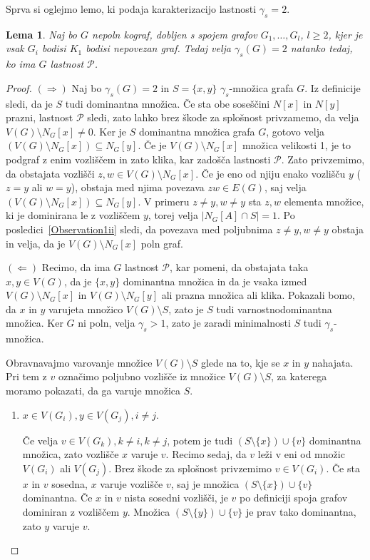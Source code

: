 \documentclass[12pt,a4paper,twoside]{article}
\theoremstyle{definition} %
\theoremstyle{plain} %
\newtheorem{lema}[definicija]{Lema}
\numberwithin{equation}{section}  %
\begin{document}
 Sprva si oglejmo lemo, ki  podaja karakterizacijo lastnosti $\gamma_s = 2$.
\begin{lema}\label{Lema4} Naj bo $G$ nepoln kograf, dobljen s spojem grafov $G_1, \dots, G_l$, $l \geq 2$, kjer je vsak $G_i$ bodisi $K_1$ bodisi nepovezan graf. Tedaj velja $\gamma_s(G) = 2$ natanko tedaj, ko ima $G$ lastnost $\mathcal{P}$.
\end{lema}
\begin{proof}
$(\Rightarrow)$ Naj bo $\gamma_s(G) = 2$ in $S = \{x,y\}$ $\gamma_s$-množica grafa $G$. Iz definicije sledi, da je $S$ tudi dominantna množica. Če sta obe soseščini $N[x]$ in $N[y]$ prazni, lastnost $\mathcal{P}$ sledi, zato lahko brez škode za splošnost privzamemo, da velja $V(G) \setminus N_G[x] \neq 0$. Ker je $S$ dominantna množica grafa $G$, gotovo velja $(V(G) \setminus N_G[x]) \subseteq N_G[y]$. Če je $V(G) \setminus N_G[x]$ množica velikosti 1, je to podgraf z enim vozliščem in zato klika, kar zadošča lastnosti $\mathcal{P}$. Zato privzemimo, da obstajata vozlišči $z,w \in V(G) \setminus N_G[x]$. Če je eno od njiju enako vozlišču $y$ ($z=y$ ali $w=y$), obstaja med njima povezava $zw \in E(G)$, saj velja $(V(G) \setminus N_G[x]) \subseteq N_G[y]$. V primeru $z \neq y, w \neq y$ sta $z,w$ elementa množice, ki je dominirana le z vozliščem $y$, torej velja $|N_G[A] \cap S| = 1$. Po posledici~\ref{Observation1ii} sledi, da povezava med poljubnima $z \neq y, w \neq y$ obstaja in velja, da je $V(G) \setminus N_G[x]$ poln graf.

$(\Leftarrow)$ Recimo, da ima $G$ lastnost $\mathcal{P}$, kar pomeni, da obstajata taka $x,y \in V(G)$, da je $\{x,y\}$ dominantna množica in da je vsaka izmed $V(G) \setminus N_G[x]$ in $V(G) \setminus N_G[y]$ ali prazna množica ali klika. Pokazali bomo, da $x$ in $y$ varujeta množico $V(G) \setminus S$, zato je $S$ tudi varnostnodominantna množica. Ker $G$ ni poln, velja $\gamma_s > 1$, zato je zaradi minimalnosti $S$ tudi $\gamma_s$-množica.

Obravnavajmo varovanje množice $V(G) \setminus S$ glede na to, kje se $x$ in $y$ nahajata. Pri tem z $v$ označimo poljubno vozlišče iz množice $V(G) \setminus S$, za katerega moramo pokazati, da ga varuje množica $S$.
\begin{enumerate}[label=($\roman*$)]
\item $x \in V(G_i), y \in V(G_j), i \neq j$.

Če velja $v \in V(G_k), k \neq i, k \neq j$, potem je tudi $(S \setminus \{x\}) \cup \{v\}$ dominantna množica, zato vozlišče $x$ varuje $v$. Recimo sedaj, da $v$ leži v eni od množic $V(G_i)$ ali $V(G_j)$. Brez škode za splošnost privzemimo $v \in V(G_i)$. Če sta $x$ in $v$ sosedna, $x$ varuje vozlišče $v$, saj je množica $(S \setminus \{x\}) \cup \{v\}$ dominantna. Če $x$ in $v$ nista sosedni vozlišči, je $v$ po definiciji spoja grafov dominiran z vozliščem $y$. Množica $(S \setminus \{y\}) \cup \{v\}$ je prav tako dominantna, zato $y$ varuje $v$. 


\end{enumerate}
\end{proof}
\end{document}
